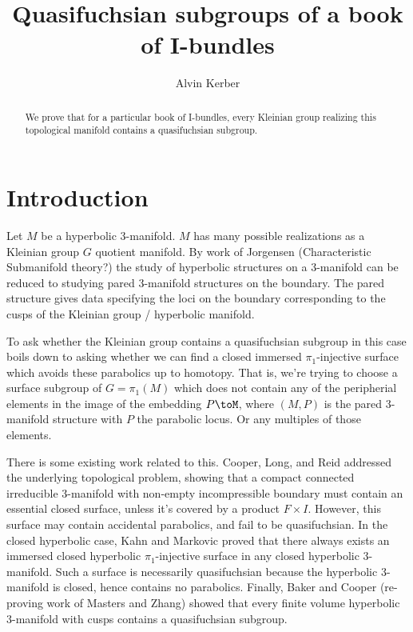 \documentclass[12pt]{amsart}
\theoremstyle{definition}
\begin{document}
\title{Quasifuchsian subgroups of a book of I-bundles}

\author{Alvin Kerber}

\begin{abstract}
We prove that for a particular book of I-bundles, every Kleinian group
realizing this topological manifold contains a quasifuchsian subgroup.
\end{abstract}

\maketitle
\section{Introduction}

Let $M$ be a hyperbolic 3-manifold. $M$ has many possible realizations as
a Kleinian group $G$ quotient manifold. By work of Jorgensen (Characteristic
Submanifold theory?) the study of hyperbolic structures on a 3-manifold can be
reduced to studying pared 3-manifold structures on the boundary. The pared
structure gives data specifying the loci on the boundary corresponding to the
cusps of the Kleinian group / hyperbolic manifold.

To ask whether the Kleinian group contains a quasifuchsian subgroup in this
case boils down to asking whether we can find a closed immersed
$\pi_1$-injective surface which avoids these parabolics up to homotopy. That
is, we're trying to choose a surface subgroup of $G=\pi_1(M)$ which does not
contain any of the peripherial elements in the image of the embedding $P\toM$,
where $(M,P)$ is the pared 3-manifold structure with $P$ the parabolic locus.
Or any multiples of those elements.

There is some existing work related to this. Cooper, Long, and Reid addressed
the underlying topological problem, showing that a compact connected
irreducible 3-manifold with non-empty incompressible boundary  must contain an
essential closed surface, unless it's covered by a product $F\times I$.
However, this surface may contain accidental parabolics, and fail to be
quasifuchsian.  In the closed hyperbolic case, Kahn and Markovic proved that
there always exists an immersed closed hyperbolic $\pi_1$-injective surface in
any closed hyperbolic 3-manifold. Such a surface is necessarily quasifuchsian
because the hyperbolic 3-manifold is closed, hence contains no parabolics.
Finally, Baker and Cooper (re-proving work of Masters and Zhang) showed that
every finite volume hyperbolic 3-manifold with cusps contains a quasifuchsian
subgroup.
\end{document}
